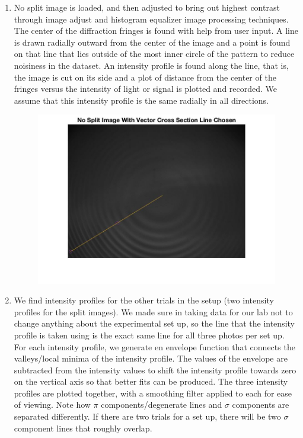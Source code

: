 \documentclass{article}
\begin{document}
    \begin{enumerate}
        \item No split image is loaded, and then adjusted to bring out highest contrast through image adjust and histogram equalizer image processing techniques. The center of the diffraction fringes is found with help from user input. A line is drawn radially outward from the center of the image and a point is found on that line that lies outside of the most inner circle of the pattern to reduce noisiness in the dataset. An intensity profile is found along the line, that is, the image is cut on its side and a plot of distance from the center of the fringes versus the intensity of light or signal is plotted and recorded. We assume that this intensity profile is the same radially in all directions.\begin{figure}[H]
    \centering
    \includegraphics[scale = 0.2]{ATMk.jpg}
    \caption{}
    \label{fig:my_label}
\end{figure}
        \item We find intensity profiles for the other trials in the setup (two intensity profiles for the split images). We made sure in taking data for our lab not to change anything about the experimental set up, so the line that the intensity profile is taken using is the exact same line for all three photos per set up. For each intensity profile, we generate en envelope function that connects the valleys/local minima of the intensity profile. The values of the envelope are subtracted from the intensity values to shift the intensity profile towards zero on the vertical axis so that better fits can be produced. The three intensity profiles are plotted together, with a smoothing filter applied to each for ease of viewing. Note how $\pi$ components/degenerate lines and $\sigma$ components are separated differently. If there are two trials for a set up, there will be two $\sigma$ component lines that roughly overlap. \begin{figure}[H]

\end{figure}
\end{enumerate}
\end{document}

